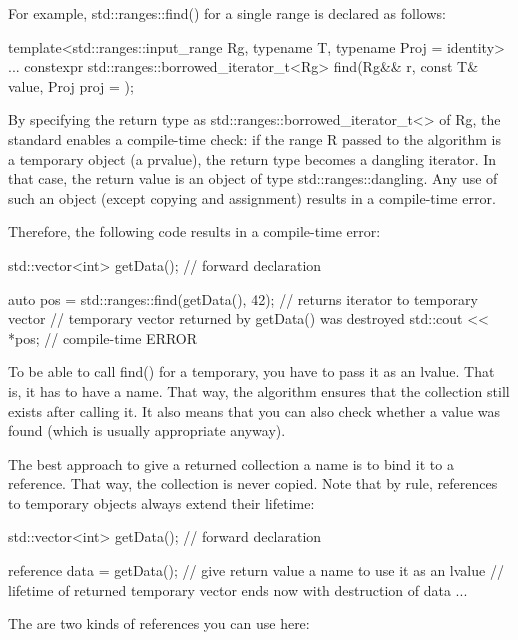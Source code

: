 For example, std::ranges::find() for a single range is declared as follows:

\begin{cpp}
template<std::ranges::input_range Rg,
			typename T,
			typename Proj = identity>
...
constexpr std::ranges::borrowed_iterator_t<Rg>
	find(Rg&& r, const T& value, Proj proj = {});
\end{cpp}

By specifying the return type as std::ranges::borrowed\_iterator\_t<> of Rg, the standard enables a compile-time check: if the range R passed to the algorithm is a temporary object (a prvalue), the return type becomes a dangling iterator. In that case, the return value is an object of type std::ranges::dangling. Any use of such an object (except copying and assignment) results in a compile-time error.

Therefore, the following code results in a compile-time error:

\begin{cpp}
std::vector<int> getData(); // forward declaration

auto pos = std::ranges::find(getData(), 42); // returns iterator to temporary vector
// temporary vector returned by getData() was destroyed
std::cout << *pos; // compile-time ERROR
\end{cpp}

To be able to call find() for a temporary, you have to pass it as an lvalue. That is, it has to have a name. That way, the algorithm ensures that the collection still exists after calling it. It also means that you can also check whether a value was found (which is usually appropriate anyway).

The best approach to give a returned collection a name is to bind it to a reference. That way, the collection is never copied. Note that by rule, references to temporary objects always extend their lifetime:

\begin{cpp}
std::vector<int> getData(); // forward declaration

reference data = getData(); // give return value a name to use it as an lvalue
// lifetime of returned temporary vector ends now with destruction of data
...
\end{cpp}

The are two kinds of references you can use here:


